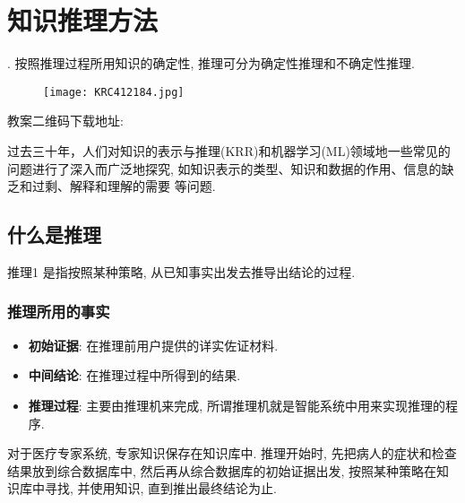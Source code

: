\chapter{知识推理方法}\label{AIchap3}
\begin{tcolorbox}[colback=white!50,colframe=orange!50,title=智能系统的推理过程]
. 按照推理过程所用知识的确定性, 推理可分为确定性推理和不确定性推理.
\end{tcolorbox}
\begin{figure}[H]
\centering
\texttt{[image: KRC412184.jpg]}
\label{KRC412184004}
\end{figure}
教案二维码下载地址: 

过去三十年，人们对知识的表示与推理(KRR)和机器学习(ML)领域地一些常见的问题进行了深入而广泛地探究, 如知识表示的类型、知识和数据的作用、信息的缺乏和过剩、解释和理解的需要 \cite{BouraouiKR2019}等问题.
\section{什么是推理}
\begin{mydef}{推理}{1}
    是指按照某种策略, 从已知事实出发去推导出结论的过程.
\end{mydef}
\subsection{推理所用的事实}
\begin{itemize}
\item \textbf{初始证据}: 在推理前用户提供的详实佐证材料.
\item \textbf{中间结论}: 在推理过程中所得到的结果.
\item \textbf{推理过程}: 主要由推理机来完成, 所谓推理机就是智能系统中用来实现推理的程序.
\end{itemize}
\begin{example}
  对于医疗专家系统, 专家知识保存在知识库中. 推理开始时, 先把病人的症状和检查结果放到综合数据库中, 然后再从综合数据库的初始证据出发, 按照某种策略在知识库中寻找, 并使用知识, 直到推出最终结论为止.
\end{example}


